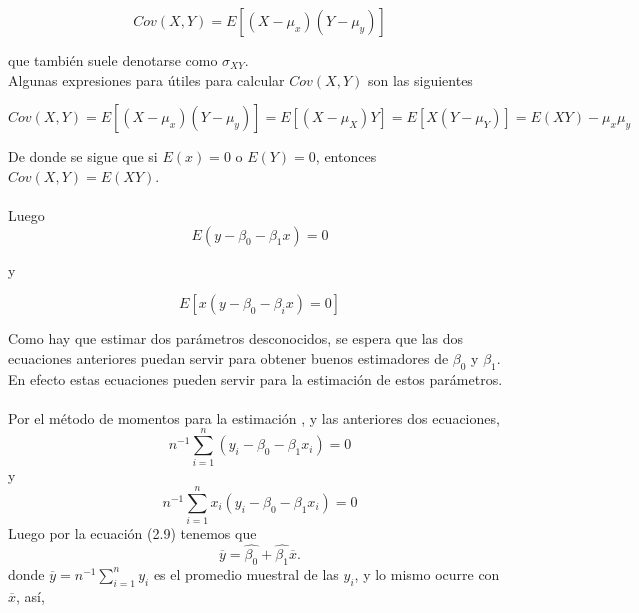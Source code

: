 \begin{enumerate}
\begin{enumerate}[\bfseries a)]
\begin{equation}
    Cov(X,Y) = E\left[(X-\mu_x)(Y-\mu_y)\right]
\end{equation}

que también suele denotarse como $\sigma_{XY}.$  \\
Algunas expresiones para útiles para calcular $Cov(X,Y)$ son las siguientes

\begin{equation}
    Cov(X,Y) = E\left[(X-\mu_x)(Y-\mu_y)\right] = E\left[(X-\mu_X)Y\right] = E\left[X(Y-\mu_Y)\right] = E(XY) - \mu_x \mu_y
\end{equation}

De donde se sigue que si $E(x)=0$ o $E(Y)=0$, entonces $Cov(X,Y) = E(XY)$.\\\\

Luego  
\begin{equation}
    E(y - \beta_0 - \beta_1x) = 0
\end{equation}
 
y 

\begin{equation}
    E\left[x(y - \beta_0 -\beta_i x )= 0\right]
\end{equation}

Como hay que estimar dos parámetros desconocidos, se espera que las dos ecuaciones anteriores puedan servir para obtener buenos estimadores de $\beta_0$ y $\beta_1$. En efecto estas ecuaciones pueden servir para la estimación de estos parámetros.\\\\

Por el método de momentos para la estimación , y las anteriores dos ecuaciones,
\begin{equation}
    n^{-1} \sum\limits_{i=1}^n (y_i - \beta_0 - \beta_1x_i) = 0
\end{equation}
y 
\begin{equation}
    n^{-1} \sum\limits_{i=1}^n x_i(y_i - \beta_0 - \beta_1x_i) = 0
\end{equation}
Luego por la ecuación (2.9) tenemos que 
\begin{equation}
    \overline{y} = \hat{\beta_0} + \hat{\beta_1}\overline{x}.
\end{equation}
donde $\overline{y} = n^{-1}\sum\limits_{i=1}^n y_i$ es el promedio muestral de las $y_i$, y lo mismo ocurre con $\overline{x}$, así, 


\end{enumerate}
\end{enumerate}
